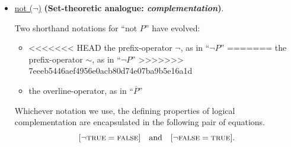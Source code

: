 \begin{itemize}
\item
\underline{{\sc not} ($\neg$)}
{\bf (Set-theoretic analogue: {\em complementation})}.


Two shorthand notations for ``{\sc not} $P$'' have evolved:
  \begin{itemize}
  \item
<<<<<<< HEAD
the prefix-operator $\neg$, as in ``$\neg P$''
=======
the prefix-operator $\sim$, as in ``$\neg P$''
>>>>>>> 7eeeb5446aef4956e0acb80d74e07ba9b5e16a1d
  \item
the overline-operator, as in ``$\overline{P}$''
  \end{itemize}
Whichever notation we use, the defining properties of logical
complementation are encapsulated in the following pair of equations.
\[
[\neg \mbox{\sc true} = \mbox{\sc false}] \ \ \mbox{ and } \ \ [\neg
  \mbox{\sc false} = \mbox{\sc true}].
\]
\end{itemize}

\medskip

